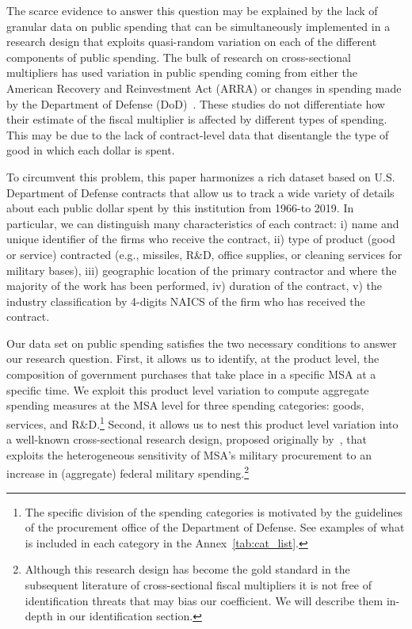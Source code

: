 \documentclass[dv_diss_main.tex]{subfiles}
\begin{document}
The scarce evidence to answer this question may be explained by the lack of granular data on public spending that can be simultaneously implemented in a research design that exploits quasi-random variation on each of the different components of public spending. The bulk of research on cross-sectional multipliers has used variation in public spending coming from either the American Recovery and Reinvestment Act (ARRA) \citep{chodorow2012does,wilson2012fiscal,conley2013american,dupor20162009} or changes in spending made by the Department of Defense (DoD)~\citep{Nakamura2014,dupor2017local,Demyanyk2019,Auerbach2020}. These studies do not differentiate how their estimate of the fiscal multiplier is affected by different types of spending. This may be due to the lack of contract-level data that disentangle the type of good in which each dollar is spent.

To circumvent this problem, this paper harmonizes a rich dataset based on U.S. Department of Defense contracts that allow us to track a wide variety of details about each public dollar spent by this institution from 1966-to 2019. In particular, we can distinguish many characteristics of each contract: i) name and unique identifier of the firms who receive the contract, ii) type of product (good or service) contracted (e.g., missiles, R\&D, office supplies, or cleaning services for military bases), iii) geographic location of the primary contractor and where the majority of the work has been performed, iv) duration of the contract, v) the industry classification by 4-digits NAICS of the firm who has received the contract. 

Our data set on public spending satisfies the two necessary conditions to answer our research question. First, it allows us to identify, at the product level, the composition of government purchases that take place in a specific MSA at a specific time. We exploit this product level variation to compute aggregate spending measures at the MSA level for three spending categories: goods, services, and R\&D.\footnote{The specific division of the spending categories is motivated by the guidelines of the procurement office of the Department of Defense. See examples of what is included in each category in the Annex~\ref{tab:cat_list}.} Second, it allows us to nest this product level variation into a well-known cross-sectional research design, proposed originally by~\cite{Nakamura2014}, that exploits the heterogeneous sensitivity of MSA's military procurement to an increase in (aggregate) federal military spending.\footnote{Although this research design has become the gold standard in the subsequent literature of cross-sectional fiscal multipliers \citep{Auerbach2019, Demyanyk2019,basso2021young,dupor2017local, Juarros2021} it is not free of identification threats that may bias our coefficient. We will describe them in-depth in our identification section.}
\end{document}
